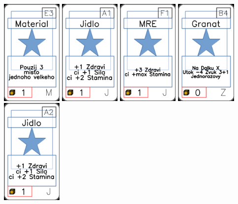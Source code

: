 \documentclass[a4paper]{article}
\begin{document}
	\includegraphics[width=3.0cm]{img-1_52}
	\includegraphics[width=3.0cm]{img-1_0}
	\includegraphics[width=3.0cm]{img-1_25}
	\includegraphics[width=3.0cm]{img-1_98}
	\includegraphics[width=3.0cm]{img-1_1}
\end{document}
